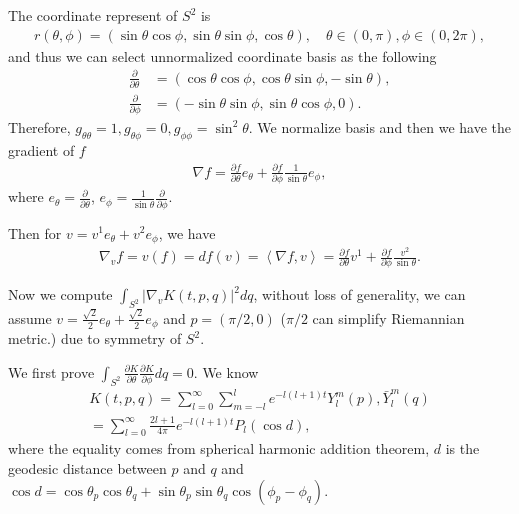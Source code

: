 The coordinate represent of $S^2$ is 
\begin{align}
	r(\theta, \phi) = (\sin \theta \cos \phi, \sin \theta \sin \phi, \cos \theta),\quad  \theta \in (0,\pi), \phi \in (0,2\pi),
\end{align}
and thus we can select unnormalized coordinate basis as the following
\begin{align}
	\frac{\partial}{\partial \theta} &= (\cos \theta \cos \phi, \cos \theta \sin \phi, -\sin \theta), \\
	\frac{\partial}{\partial \phi}  &= (-\sin\theta \sin \phi, \sin \theta\cos \phi,0).
\end{align}
Therefore, $g_{\theta \theta}=1 , g_{\theta \phi}=0, g_{\phi \phi}=\sin^2 \theta$. We normalize basis and then we have the gradient of $f$
\begin{align}
	\nabla f = \frac{\partial f}{\partial \theta} e_\theta + \frac{\partial f}{\partial \phi} \frac{1}{\sin \theta} e_\phi,
\end{align}
where $e_\theta = \frac{\partial}{\partial \theta}$, $e_\phi = \frac{1}{\sin \theta}\frac{\partial}{\partial \phi}$.

Then for $v= v^1 e_\theta + v^2 e_\phi$, we have
\begin{align}
	\nabla_v f = v(f)= df(v)=\left\langle \nabla f, v\right\rangle = \frac{\partial f}{\partial \theta} v^1 + \frac{\partial f}{\partial \phi} \frac{v^2}{\sin \theta}.
\end{align}

Now we compute $\int_{S^2} |\nabla_v K(t,p,q)|^2 dq$, without loss of generality, we can assume $v=\frac{\sqrt{2}}{2}e_\theta+\frac{\sqrt{2}}{2}e_\phi$ and $p=(\pi/2,0)$ ($\pi/2$ can simplify Riemannian metric.) due to symmetry of $S^2$.

We first prove $\int_{S^2} \frac{\partial K}{\partial \theta} \frac{\partial K}{\partial \phi} dq =0$. We know 
\begin{align}
	K(t,p,q) = \sum_{l=0}^\infty \sum_{m=-l}^{l} e^{-l(l+1) t} Y_{l}^m(p),\bar{Y}_{l}^m(q) \\
	=\sum_{l=0}^{\infty} \frac{2l+1}{4\pi}e^{-l(l+1) t} P_l(\cos d),
\end{align}
where the equality comes from spherical harmonic addition theorem, $d$ is the geodesic distance between $p$ and $q$ and $\cos d = \cos \theta_p \cos \theta_q + \sin \theta_p \sin \theta_q \cos(\phi_p -\phi_q)$.


